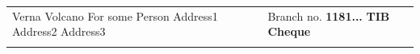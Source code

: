 \documentclass{article}%
\begin{document}
%
\normalsize%
\begin{tabu}{X[c] X[c]}%
\begin{minipage}[h]{0.30\textwidth}%
Verna Volcano \hrulefill%
\newline%
%
For some Person%
\newline%
%
Address1%
\newline%
%
Address2%
\newline%
%
Address3%
\end{minipage}&\begin{minipage}[t!]{0.30\textwidth}%
\flushleft%
Branch no. \hrulefill%
\linebreak%
\textbf{1181...}%
\linebreak%
\textbf{TIB Cheque}%
\end{minipage}\\%
&\\%
\end{tabu}%
\renewcommand{\arraystretch}{1.5}%
\end{document}
